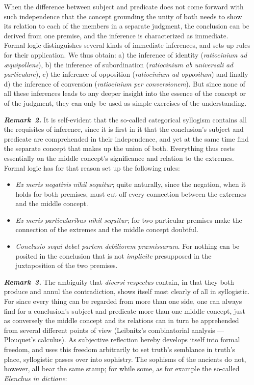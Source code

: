 \documentclass[12pt]{book}
\newcommand{\anm}[1]{\emph{\textbf{Remark~#1.}}}
\begin{document}
When the difference between subject and predicate does not come forward with
such independence that the concept grounding the unity of both needs to show
its relation to each of the members in a separate judgment, the conclusion
can be derived from one premise, and the inference is characterized as
immediate. Formal logic distinguishes several kinds of immediate inferences,
and sets up rules for their application. We thus obtain: a) the inference of
identity (\textit{ratiocinium ad æquipollens}), b) the inference of
subordination (\textit{ratiocinium ab universali ad particulare}), c) the
inference of opposition (\textit{ratiocinium ad oppositum}) and finally d)
the inference of conversion (\textit{ratiocinium per conversionem}). But
since none of all these inferences leads to any deeper insight into the
essence of the concept or of the judgment, they can only be used as simple
exercises of the understanding.

\anm{2} It is self-evident that the so-called categorical syllogism contains
all the requisites of inference, since it is first in it that the
conclusion's subject and predicate are comprehended in their independence,
and yet at the same time find the separate concept that makes up the union
of both. Everything thus rests essentially on the middle concept's
significance and relation to the extremes. Formal logic has for that reason
set up the following rules:

\begin{itemize}
\item[1)] \textit{Ex meris negativis nihil sequitur}; quite naturally,
  since the negation, when it holds for both premises, must cut off every
  connection between the extremes and the middle concept.
\item[2)] \textit{Ex meris particularibus nihil sequitur}; for two
  particular premises make the connection of the extremes and the middle
  concept doubtful.
\item[3)] \textit{Conclusio sequi debet partem debiliorem præmissarum}. For
  nothing can be posited in the conclusion that is not \textit{implicite}
  presupposed in the juxtaposition of the two premises.
\end{itemize}

\anm{3} The ambiguity that \textit{diversi respectus} contain, in that they
both produce and annul the contradiction, shows itself most clearly of all
in syllogistic. For since every thing can be regarded from more than one
side, one can always find for a conclusion's subject and predicate more than
one middle concept, just as conversely the middle concept and its relations
can in turn be apprehended from several different points of view
(Leibnitz's combinatorial analysis --- Plouquet's calculus). As subjective
reflection hereby develops itself into formal freedom, and uses this freedom
arbitrarily to set truth's semblance in truth's place, syllogistic passes
over into sophistry. The sophisms of the ancients do not, however, all bear
the same stamp; for while some, as for example the so-called
\textit{Elenchus in dictione}:
\end{document}
